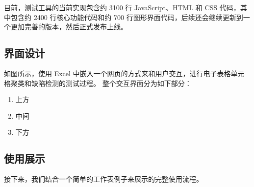 目前，\eg 测试工具的当前实现包含约 3100 行 JavaScript、HTML 和 CSS 代码，其中包含约 2400 行核心功能代码和约 700 行图形界面代码，后续还会继续更新到一个更加完善的版本，然后正式发布上线。






\subsection{界面设计}

如图所示，\eg 使用 Excel 中嵌入一个网页的方式来和用户交互，进行电子表格单元格聚类和缺陷检测的测试过程。
整个交互界面分为如下部分：
\begin{enumerate}
    \item 上方 
    \item 中间 
    \item 下方 
\end{enumerate}

\subsection{使用展示}

接下来，我们结合一个简单的工作表例子来展示\eg 的完整使用流程。 